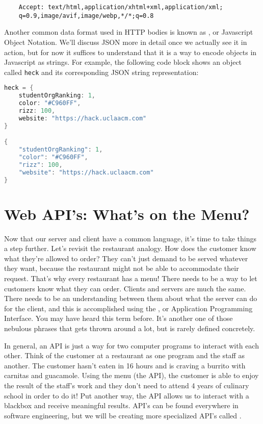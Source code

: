 \begin{verbatim}
    Accept: text/html,application/xhtml+xml,application/xml;
    q=0.9,image/avif,image/webp,*/*;q=0.8
\end{verbatim}

Another common data format used in HTTP bodies is known as , or Javascript Object Notation. We'll discuss JSON more in detail once we actually see it in action, but for now it suffices to understand that it is a way to encode objects in Javascript as strings. For example, the following code block shows an object called \texttt{heck} and its corresponding JSON string representation:

\vspace{.5cm}

\begin{lstlisting}[language=Java]
heck = {
    studentOrgRanking: 1,
    color: "#C960FF",
    rizz: 100,
    website: "https://hack.uclaacm.com"
}

{
    "studentOrgRanking": 1,
    "color": "#C960FF",
    "rizz": 100,
    "website": "https://hack.uclaacm.com"
}
\end{lstlisting}

\section{Web API's: What's on the Menu?}

Now that our server and client have a common language, it's time to take things a step further. Let's revisit the restaurant analogy. How does the customer know what they're allowed to order? They can't just demand to be served whatever they want, because the restaurant might not be able to accommodate their request. That's why every restaurant has a menu! There needs to be a way to let customers know what they can order. Clients and servers are much the same. There needs to be an understanding between them about what the server can do for the client, and this is accomplished using the , or Application Programming Interface. You may have heard this term before. It's another one of those nebulous phrases that gets thrown around a lot, but is rarely defined concretely.

In general, an API is just a way for two computer programs to interact with each other. Think of the customer at a restaurant as one program and the staff as another. The customer hasn't eaten in 16 hours and is craving a burrito with carnitas and guacamole. Using the menu (the API), the customer is able to enjoy the result of the staff's work and they don't need to attend 4 years of culinary school in order to do it! Put another way, the API allows us to interact with a blackbox and receive meaningful results. API's can be found everywhere in software engineering, but we will be creating more specialized API's called .

